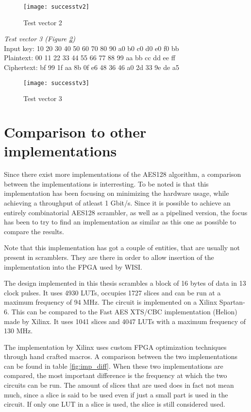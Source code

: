 \begin{figure}
  \texttt{[image: successtv2]}
  \caption{Test vector 2}
  \label{test:2}
\end{figure}

\emph{Test vector 3 (Figure \ref{test:3})} \\
Input key: 10 20 30 40 50 60 70 80 90 a0 b0 c0 d0 e0 f0 bb\\
Plaintext: 00 11 22 33 44 55 66 77 88 99 aa bb cc dd ee ff\\
Ciphertext: bf 99 1f aa 8b 0f e6 48 36 46 a0 2d 33 9e de a5

\begin{figure}
  \texttt{[image: successtv3]}
  \caption{Test vector 3}
  \label{test:3}
\end{figure}

\section{Comparison to other implementations}
Since there exist more implementations of the AES128 algorithm, a 
comparison between the implementations is interresting. To be noted is 
that this implementation has been focusing on minimizing the hardware 
usage, while achieving a throughput of atleast 1 Gbit/s. Since it is 
possible to achieve an entirely combinatorial AES128 scrambler, as 
well as a pipelined version, the focus has been to try to find an 
implementation as similar as this one as possible to compare the 
results.

Note that this implementation has got a couple of entities, that are 
usually not present in scramblers. They are there in order to allow 
insertion of the implementation into the FPGA used by WISI.

The design implemented in this thesis scrambles a block of 16 bytes 
of data in 13 clock pulses. It uses 4930 LUTs, occupies 1727 slices 
and can be run at a maximum frequency of 94 MHz. The circuit is 
implemented on a Xilinx Spartan-6. This can be compared to the Fast 
AES XTS/CBC implementation (Helion) made by Xilinx. It uses 1041 
slices and 4047 LUTs with a maximum frequency of 130 MHz. 
\cite{Xilinx:AES} 

The implementation by Xilinx uses custom FPGA optimization techniques 
through hand crafted macros. A comparison between the two 
implementations can be found in table \ref{fig:imp_diff}. When these 
two implementations are compared, the most important difference is the 
frequency at which the two circuits can be run. The amount of slices 
that are used does in fact not mean much, since a slice is said to be 
used even if just a small part is used in the circuit. If only one LUT 
in a slice is used, the slice is still considered used. 

